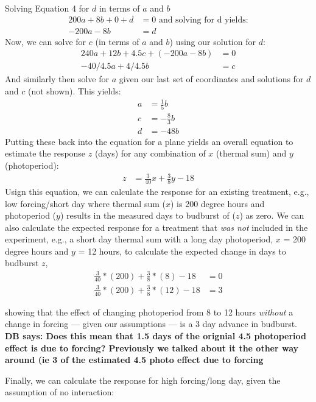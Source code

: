 \documentclass[11pt]{article}
\begin{document}
Solving Equation 4 for $d$ in terms of $a$ and $b$
\begin{align}
200a + 8b + 0 + d & = 0 \text{ and solving for d yields:} \\
-200a - 8b & =  d  %
\end{align}
Now, we can solve for $c$ (in terms of $a$ and $b$) using our solution for $d$:
\begin{align}
240a+12b+4.5c+(-200a - 8b) & = 0\\
-40/4.5a+4/4.5b & = c%
\end{align}
And similarly then solve for $a$ given our last set of coordinates and solutions for $d$ and $c$ (not shown). This yields:
\begin{align}
a & =\frac{1}{5}b\\
c & =-\frac{8}{3}b\\
d & =-48b
\end{align}
Putting these back into the equation for a plane yields an overall equation to estimate the response $z$ (days) for any combination of $x$ (thermal sum) and $y$ (photoperiod):
\begin{align}
z & = \frac{3}{40}x + \frac{3}{8}y-18
\end{align}
Usign this equation, we can calculate the response for an existing treatment, e.g., low forcing/short day where thermal sum ($x$) is 200 degree hours and photoperiod ($y$) results in the measured days to budburst of ($z$) as zero.  We can also calculate the expected response for a treatment that \textit{was not} included in the experiment, e.g., a short day thermal sum with a long day photoperiod, $x$ = 200 degree hours and $y$ = 12 hours, to calculate the expected change in days to budburst $z$,
\begin{align}
\frac{3}{40}*(200) + \frac{3}{8}*(8)-18 &=0\\ 
\frac{3}{40}*(200) + \frac{3}{8}*(12)-18 &=3 
\end{align}

showing that the effect of changing photoperiod from 8 to 12 hours \textit{without} a change in forcing --- given our assumptions --- is a 3 day advance in budburst.\\ 
\textbf{DB says:  Does this mean that 1.5 days of the orignial 4.5 photoperiod effect is due to forcing? Previously we talked about it the other way around (ie 3 of the estimated 4.5 photo effect due to forcing}

Finally, we can calculate the response for high forcing/long day, given the assumption of no interaction:
 
\end{document}
